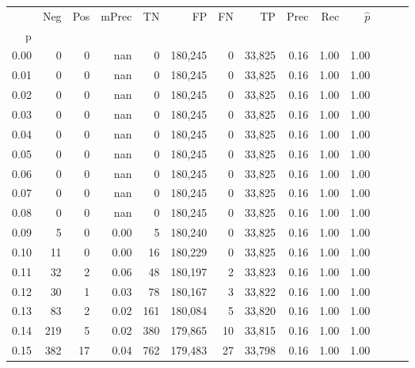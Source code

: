 \begin{tabular}{rrrrrrrrrrrrrr}
\toprule
{} &    Neg &  Pos & mPrec &       TN &       FP &      FN &      TP &  Prec &   Rec & $\hat{p}$ \\
p    &        &      &       &          &          &         &         &       &       &           \\
\midrule
0.00 &      0 &    0 &   nan &        0 &  180,245 &       0 &  33,825 &  0.16 &  1.00 &      1.00 \\
0.01 &      0 &    0 &   nan &        0 &  180,245 &       0 &  33,825 &  0.16 &  1.00 &      1.00 \\
0.02 &      0 &    0 &   nan &        0 &  180,245 &       0 &  33,825 &  0.16 &  1.00 &      1.00 \\
0.03 &      0 &    0 &   nan &        0 &  180,245 &       0 &  33,825 &  0.16 &  1.00 &      1.00 \\
0.04 &      0 &    0 &   nan &        0 &  180,245 &       0 &  33,825 &  0.16 &  1.00 &      1.00 \\
0.05 &      0 &    0 &   nan &        0 &  180,245 &       0 &  33,825 &  0.16 &  1.00 &      1.00 \\
0.06 &      0 &    0 &   nan &        0 &  180,245 &       0 &  33,825 &  0.16 &  1.00 &      1.00 \\
0.07 &      0 &    0 &   nan &        0 &  180,245 &       0 &  33,825 &  0.16 &  1.00 &      1.00 \\
0.08 &      0 &    0 &   nan &        0 &  180,245 &       0 &  33,825 &  0.16 &  1.00 &      1.00 \\
0.09 &      5 &    0 &  0.00 &        5 &  180,240 &       0 &  33,825 &  0.16 &  1.00 &      1.00 \\
0.10 &     11 &    0 &  0.00 &       16 &  180,229 &       0 &  33,825 &  0.16 &  1.00 &      1.00 \\
0.11 &     32 &    2 &  0.06 &       48 &  180,197 &       2 &  33,823 &  0.16 &  1.00 &      1.00 \\
0.12 &     30 &    1 &  0.03 &       78 &  180,167 &       3 &  33,822 &  0.16 &  1.00 &      1.00 \\
0.13 &     83 &    2 &  0.02 &      161 &  180,084 &       5 &  33,820 &  0.16 &  1.00 &      1.00 \\
0.14 &    219 &    5 &  0.02 &      380 &  179,865 &      10 &  33,815 &  0.16 &  1.00 &      1.00 \\
0.15 &    382 &   17 &  0.04 &      762 &  179,483 &      27 &  33,798 &  0.16 &  1.00 &      1.00 \\

\end{tabular}
